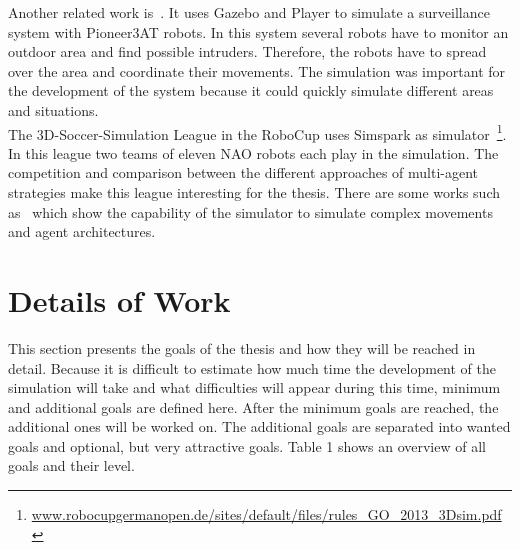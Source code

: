 \documentclass[11pt,a4paper,titlepage]{article}
\begin{document}
Another related work is~\cite{SurveillanceSystem}. It uses Gazebo and Player to simulate a surveillance system with Pioneer3AT robots. In this system several robots have to monitor an outdoor area and find possible intruders. Therefore, the robots have to spread over the area and coordinate their movements. The simulation was important for the development of the system because it could quickly simulate different areas and situations.\\
The 3D-Soccer-Simulation League in the RoboCup uses Simspark as simulator~\footnote{\url{www.robocupgermanopen.de/sites/default/files/rules_GO_2013_3Dsim.pdf}}. In this league two teams of eleven NAO robots each play in the simulation. The competition and comparison between the different approaches of multi-agent strategies make this league interesting for the thesis. There are some works such as~\cite{SoccerChampion} which show the capability of the simulator to simulate complex movements and agent architectures.

\section{Details of Work}
This section presents the goals of the thesis and how they will be reached in detail. Because it is difficult to estimate how much time the development of the simulation will take and what difficulties will appear during this time, minimum and additional goals are defined here. After the minimum goals are reached, the additional ones will be worked on. The additional goals are separated into wanted goals and optional, but very attractive goals. Table 1 shows an overview of all goals and their level.
\end{document}
